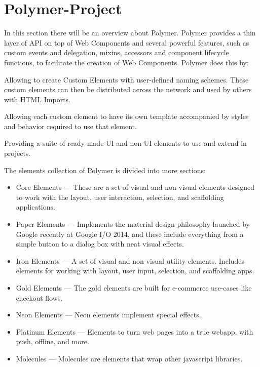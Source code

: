 \section{Polymer-Project}
\label{sec:TCH_polymer}

In this section there will be an overview about Polymer. Polymer provides a thin layer of API on top of Web Components and several powerful features, such as custom events and delegation, mixins, accessors and component lifecycle functions, to facilitate the creation of Web Components. Polymer does this by:

Allowing to create Custom Elements with user-defined naming schemes. These custom elements can then be distributed across the network and used by others with HTML Imports.

Allowing each custom element to have its own template accompanied by styles and behavior required to use that element.

Providing a suite of ready-made UI and non-UI elements to use and extend in projects.

The elements collection of Polymer is divided into more sections:

\begin{itemize}

\item Core Elements — These are a set of visual and non-visual elements designed to work with the layout, user interaction, selection, and scaffolding applications.
\item Paper Elements — Implements the material design philosophy launched by Google recently at Google I/O 2014, and these include everything from a simple button to a dialog box with neat visual effects.
\item Iron Elements — A set of visual and non-visual utility elements. Includes elements for working with layout, user input, selection, and scaffolding apps.
\item Gold Elements — The gold elements are built for e-commerce use-cases like checkout flows.
\item Neon Elements — Neon elements implement special effects.
\item Platinum Elements — Elements to turn web pages into a true webapp, with push, offline, and more.
\item Molecules — Molecules are elements that wrap other javascript libraries.
\end{itemize}


